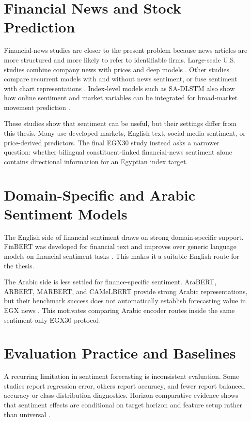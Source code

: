 \section{Financial News and Stock Prediction}

Financial-news studies are closer to the present problem because news articles are more structured and more likely to refer to identifiable firms. Large-scale U.S. studies combine company news with prices and deep models \cite{mohan2019news}. Other studies compare recurrent models with and without news sentiment, or fuse sentiment with chart representations \cite{dahal2023comparative, huang2021candlestick}. Index-level models such as SA-DLSTM also show how online sentiment and market variables can be integrated for broad-market movement prediction \cite{zhao2023integrated}.

These studies show that sentiment can be useful, but their settings differ from this thesis. Many use developed markets, English text, social-media sentiment, or price-derived predictors. The final EGX30 study instead asks a narrower question: whether bilingual constituent-linked financial-news sentiment alone contains directional information for an Egyptian index target.

\section{Domain-Specific and Arabic Sentiment Models}

The English side of financial sentiment draws on strong domain-specific support. FinBERT was developed for financial text and improves over generic language models on financial sentiment tasks \cite{araci2019finbert}. This makes it a suitable English route for the thesis.

The Arabic side is less settled for finance-specific sentiment. AraBERT, ARBERT, MARBERT, and CAMeLBERT provide strong Arabic representations, but their benchmark success does not automatically establish forecasting value in EGX news \cite{antoun2020arabert, abdulmageed2021arbert, inoue2021camelbert}. This motivates comparing Arabic encoder routes inside the same sentiment-only EGX30 protocol.

\section{Evaluation Practice and Baselines}

A recurring limitation in sentiment forecasting is inconsistent evaluation. Some studies report regression error, others report accuracy, and fewer report balanced accuracy or class-distribution diagnostics. Horizon-comparative evidence shows that sentiment effects are conditional on target horizon and feature setup rather than universal \cite{liapis2023deep}.

